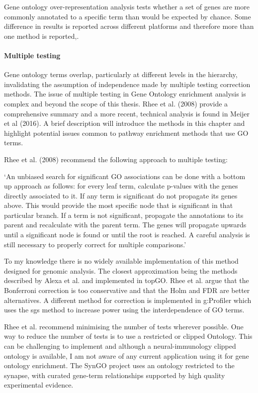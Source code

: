 Gene ontology over-representation analysis tests whether a set of genes are more commonly annotated to a specific term  than would be expected by chance. Some difference in results is reported across different platforms and therefore more than one method is reported\cite{rhee2008use},\cite{khatri2005ontological}. 


\paragraph{Multiple testing}
Gene ontology terms overlap, particularly at different levels in the hierarchy, invalidating the assumption of independence made by multiple testing correction methods. The issue of multiple testing in Gene Ontology enrichment analysis is complex and beyond the scope of this thesis. Rhee et al. (2008) \cite{rhee2008use} provide a comprehensive summary and a more recent, technical analysis is found in Meijer et al (2016)\cite{meijer2016multiple}. A brief description will introduce the methods in this chapter and highlight potential issues common to pathway enrichment methods that use GO terms.

Rhee et al. (2008) \cite{rhee2008use} recommend the following approach to multiple testing:

`An unbiased search for significant GO associations can be done with a bottom up approach as follows: for every leaf term, calculate p-values with the genes directly associated to it. If any term is significant do not propagate its genes above. This would provide the most specific node that is significant in that particular branch. If a term is not significant, propagate the annotations to its parent and recalculate with the parent term. The genes will propagate upwards until a significant node is found or until the root is reached. A careful analysis is still necessary to properly correct for multiple comparisons.\cite{rhee2008use}'

 To my knowledge there is no widely available implementation of this method designed for genomic analysis. The closest approximation being the methods described by Alexa et al.\cite{alexa2006improved} and implemented in topGO\cite{alexa2009gene}.  Rhee et al.\cite{rhee2008use} argue that the Bonferroni correction is too conservative and that the Holm and FDR are better alternatives. A different method for correction is implemented in g:Profiler\cite{raudvere2019g} which uses the sgs method to increase power using the interdependence of GO terms. 
 
 Rhee et al. recommend minimising the number of tests wherever possible\cite{rhee2008use}. One way to reduce the number of tests is to use a restricted or clipped Ontology. This can be challenging to implement and although a neural-immunology clipped ontology is available\cite{geifman2010neural}, I am not aware of any current application using it for gene ontology enrichment. The SynGO project\cite{koopmans2019syngo} uses an ontology restricted to the synapse, with curated gene-term relationships supported by high quality experimental evidence. 

